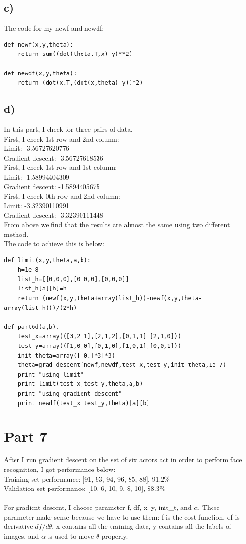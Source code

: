 \documentclass{article}
\begin{document}
\subsection{c)} The code for my newf and newdf:
\begin{lstlisting}
def newf(x,y,theta):
    return sum((dot(theta.T,x)-y)**2)

def newdf(x,y,theta):
    return (dot(x.T,(dot(x,theta)-y))*2)
\end{lstlisting}

\subsection{d)}
In this part, I check for three pairs of data.
\\First, I check 1st row and 2nd column:
\\Limit: -3.56727620776
\\Gradient descent: -3.56727618536
\\First, I check 1st row and 1st column:
\\Limit: -1.58994404309
\\Gradient descent: -1.5894405675
\\First, I check 0th row and 2nd column:
\\Limit: -3.32390110991
\\Gradient descent: -3.32390111448
\\From above we find that the results are almost the same using two different method.
\\The code to achieve this is below:
\begin{lstlisting}
def limit(x,y,theta,a,b):
    h=1e-8
    list_h=[[0,0,0],[0,0,0],[0,0,0]]
    list_h[a][b]=h
    return (newf(x,y,theta+array(list_h))-newf(x,y,theta-array(list_h)))/(2*h)
    
def part6d(a,b):
    test_x=array(([3,2,1],[2,1,2],[0,1,1],[2,1,0]))
    test_y=array(([1,0,0],[0,1,0],[1,0,1],[0,0,1]))
    init_theta=array([[0.]*3]*3)
    theta=grad_descent(newf,newdf,test_x,test_y,init_theta,1e-7)
    print "using limit"
    print limit(test_x,test_y,theta,a,b)
    print "using gradient descent"
    print newdf(test_x,test_y,theta)[a][b]
\end{lstlisting}

\section{Part 7}
After I run gradient descent on the set of six actors act in order to perform face recognition, I got performance below:
\\Training set performance: [91, 93, 94, 96, 85, 88], 91.2\%
\\Validation set performance: [10, 6, 10, 9, 8, 10], 88.3\%
\\
\\For gradient descent, I choose parameter f, df, x, y, init\_t, and $\alpha$. These parameter make sense because we have to use them: f is the cost function, df is derivative $df/d\theta$, x contains all the training data, y contains all the labels of images, and $\alpha$ is used to move $\theta$ properly.
\end{document}
